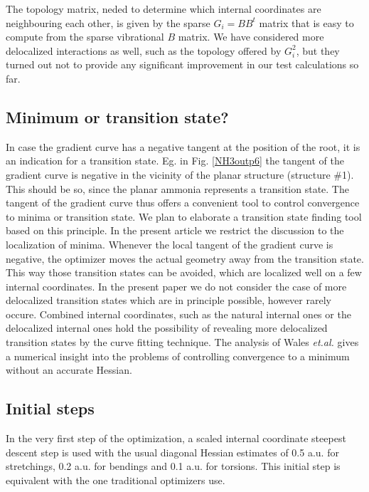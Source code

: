 \documentclass[prl,aps,twocolumn,showpacs,twocolumngrid,superbib]{revtex4}
\begin{document}
The topology matrix, neded to determine which internal coordinates
are neighbouring each other, is given by 
the sparse $G_{i}=BB^{t}$ matrix that is easy to compute from the
sparse vibrational $B$ matrix. We have considered more delocalized 
interactions as well, such as the topology offered by $G_i^2$,
but they turned out not to provide any significant improvement in our
test calculations so far.


\subsection{Minimum or transition state?}
In case the gradient curve has a negative tangent at the position
of the root, it is an indication for a transition state. 
Eg. in Fig. \ref{NH3outp6} the tangent of the gradient curve 
is negative in the vicinity of the planar
structure (structure \#1). This should be so, since the planar
ammonia represents a transition state. The tangent of the gradient 
curve thus offers a
convenient tool to control convergence to minima or transition state.
We plan to elaborate a transition state finding tool based on this 
principle. In the present article we restrict the discussion
to the localization of minima. Whenever the local tangent  
of the gradient curve
is negative, the optimizer moves the actual geometry away from 
the transition state. This way those transition states 
can be avoided, which are localized well on a few internal coordinates. 
In the present paper we do not consider the case of more 
delocalized transition states which are in principle possible,
however rarely occure. Combined internal coordinates, such
as the natural internal ones \cite{Pulay_natural_internals} or the
delocalized internal ones \cite{Baker_deloc_1} hold the possibility
of revealing more delocalized transition states by the
curve fitting technique. The analysis of Wales {\it et.al.} 
\cite{Wales_saddlepoint}
gives a numerical insight into the problems of controlling
convergence to a minimum without an accurate Hessian.

\subsection{Initial steps}
In the very first step of the optimization,
a scaled internal coordinate steepest descent step is used
with the usual diagonal Hessian estimates of
0.5 a.u. for stretchings, 0.2 a.u. for bendings and 0.1 a.u.
for torsions. This initial step is equivalent with the one
traditional optimizers use.
\end{document}
